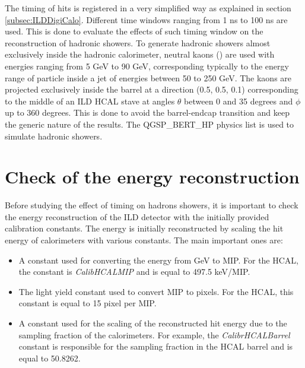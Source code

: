 \label{sec:ILDTiming}

The timing of hits is registered in a very simplified way as explained in section \ref{subsec:ILDDigiCalo}. Different time windows ranging from 1 ns to 100 ns are used. This is done to evaluate the effects of such timing window on the reconstruction of hadronic showers. To generate hadronic showers almost exclusively inside the hadronic calorimeter, neutral kaons (\kzeroL{}) are used with energies ranging from 5 GeV to 90 GeV, corresponding typically to the energy range of particle inside a jet of energies between 50 to 250 GeV. The kaons are projected exclusively inside the barrel at a direction (0.5, 0.5, 0.1) corresponding to the middle of an ILD HCAL stave at angles $\theta$ between 0 and 35 degrees and $\phi$ up to 360 degrees. This is done to avoid the barrel-endcap transition and keep the generic nature of the results. The QGSP\_BERT\_HP physics list is used to simulate hadronic showers.

\section{Check of the energy reconstruction}

Before studying the effect of timing on hadrons showers, it is important to check the energy reconstruction of the ILD detector with the initially provided calibration constants. The energy is initially reconstructed by scaling the hit energy of calorimeters with various constants. The main important ones are:
\begin{itemize}
  \item A constant used for converting the energy from GeV to MIP. For the HCAL, the constant is \textit{CalibHCALMIP} and is equal to 497.5 keV/MIP.
  \item The light yield constant used to convert MIP to pixels. For the HCAL, this constant is equal to 15 pixel per MIP.
  \item A constant used for the scaling of the reconstructed hit energy due to the sampling fraction of the calorimeters. For example, the \textit{CalibrHCALBarrel} constant is responsible for the sampling fraction in the HCAL barrel and is equal to 50.8262.
\end{itemize}


